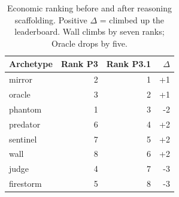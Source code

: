 \begin{table}[ht]
\centering
\small
\begin{tabular}{lrrr}
\hline
Archetype & Rank P3 & Rank P3.1 & $\Delta$ \\
\hline
mirror & 2 & 1 & +1 \\
oracle & 3 & 2 & +1 \\
phantom & 1 & 3 & -2 \\
predator & 6 & 4 & +2 \\
sentinel & 7 & 5 & +2 \\
wall & 8 & 6 & +2 \\
judge & 4 & 7 & -3 \\
firestorm & 5 & 8 & -3 \\
\hline
\end{tabular}
\caption{Economic ranking before and after reasoning scaffolding. Positive $\Delta$ = climbed up the leaderboard. Wall climbs by seven ranks; Oracle drops by five.}
\label{tab:econ-inversion}
\end{table}
